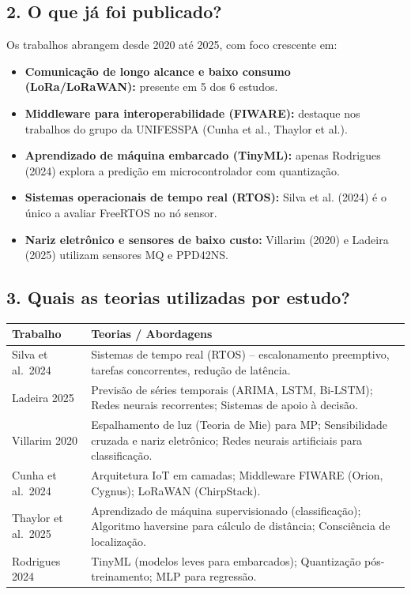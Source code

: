 \documentclass[12pt,a4paper]{article}
\begin{document}
\subsection*{2. O que já foi publicado?}

Os trabalhos abrangem desde 2020 até 2025, com foco crescente em:

\begin{itemize}[leftmargin=*]
  \item \textbf{Comunicação de longo alcance e baixo consumo (LoRa/LoRaWAN):} presente em 5 dos 6 estudos.
  \item \textbf{Middleware para interoperabilidade (FIWARE):} destaque nos trabalhos do grupo da UNIFESSPA (Cunha et al., Thaylor et al.).
  \item \textbf{Aprendizado de máquina embarcado (TinyML):} apenas Rodrigues (2024) explora a predição em microcontrolador com quantização.
  \item \textbf{Sistemas operacionais de tempo real (RTOS):} Silva et al. (2024) é o único a avaliar FreeRTOS no nó sensor.
  \item \textbf{Nariz eletrônico e sensores de baixo custo:} Villarim (2020) e Ladeira (2025) utilizam sensores MQ e PPD42NS.
\end{itemize}

\subsection*{3. Quais as teorias utilizadas por estudo?}

\begin{table}[H]
\centering
\small
\begin{tabularx}{\textwidth}{|p{3.5cm}|X|}
\hline
\textbf{Trabalho} & \textbf{Teorias / Abordagens} \\
\hline
Silva et al.\ 2024 & Sistemas de tempo real (RTOS) – escalonamento preemptivo, tarefas concorrentes, redução de latência. \\
\hline
Ladeira 2025 & Previsão de séries temporais (ARIMA, LSTM, Bi-LSTM); Redes neurais recorrentes; Sistemas de apoio à decisão. \\
\hline
Villarim 2020 & Espalhamento de luz (Teoria de Mie) para MP; Sensibilidade cruzada e nariz eletrônico; Redes neurais artificiais para classificação. \\
\hline
Cunha et al.\ 2024 & Arquitetura IoT em camadas; Middleware FIWARE (Orion, Cygnus); LoRaWAN (ChirpStack). \\
\hline
Thaylor et al.\ 2025 & Aprendizado de máquina supervisionado (classificação); Algoritmo haversine para cálculo de distância; Consciência de localização. \\
\hline
Rodrigues 2024 & TinyML (modelos leves para embarcados); Quantização pós-treinamento; MLP para regressão. \\
\hline
\end{tabularx}
\end{table}
\end{document}
